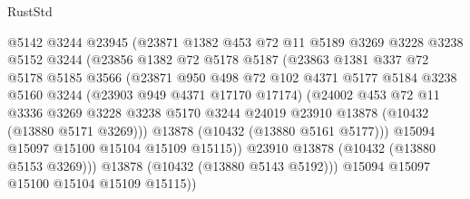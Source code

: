 \begin{lexlean}{RustStd}
\begin{coremodule}
                        @5142
                        @3244
                        @23945
                        (@23871
                          @1382
                          @453
                          @72
                          @11
                          @5189
                          @3269
                          @3228
                          @3238
                          @5152
                          @3244
                          (@23856
                            @1382
                            @72
                            @5178
                            @5187
                            (@23863
                              @1381
                              @337
                              @72
                              @5178
                              @5185
                              @3566
                              (@23871
                                @950
                                @498
                                @72
                                @102
                                @4371
                                @5177
                                @5184
                                @3238
                                @5160
                                @3244
                                (@23903 @949 @4371 @17170 @17174)
                                (@24002
                                  @453
                                  @72
                                  @11
                                  @3336
                                  @3269
                                  @3228
                                  @3238
                                  @5170
                                  @3244
                                  @24019
                                  @23910
                                  @13878
                                  (@10432 (@13880 @5171 @3269)))
                                @13878
                                (@10432 (@13880 @5161 @5177)))
                              @15094
                              @15097
                              @15100
                              @15104
                              @15109
                              @15115))
                          @23910
                          @13878
                          (@10432 (@13880 @5153 @3269)))
                        @13878
                        (@10432 (@13880 @5143 @5192)))
                      @15094
                      @15097
                      @15100
                      @15104
                      @15109
                      @15115))

\end{coremodule}
\end{lexlean}
